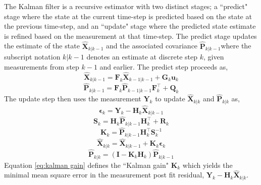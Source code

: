 \documentclass[fleqn,usenatbib,useAMS]{mnras}
\providecommand{\DIFaddbegin}{} %
\providecommand{\DIFaddend}{} %
\newcommand{\DIFaddincludegraphics}[2][]{{\color{blue}\fbox{\DIFOincludegraphics[#1]{#2}}}} %
\DeclareRobustCommand{\DIFaddbegin}{\DIFOaddbegin \let\includegraphics\DIFaddincludegraphics} %
\DeclareRobustCommand{\DIFaddend}{\DIFOaddend \let\includegraphics\DIFOincludegraphics} %
\begin{document}
The Kalman filter is a recursive estimator with two distinct stages; a ``predict" stage where the state at the current time-step is predicted based on the state at the previous time-step, and an ``update" stage where the predicted state estimate is refined based on the measurement at that time-step. The predict stage updates the estimate of the state $\hat{\boldsymbol{X}}_{k|k-1}$ and the associated covariance $\hat{\boldsymbol{P}}_{k|k-1}$where the subscript notation ${k|k-1}$ denotes an estimate at discrete step $k$, given measurements from step $k-1$ and earlier. The predict step proceeds as,
\begin{equation}
\hat{\boldsymbol{X}}_{k|k-1} =  \boldsymbol{F}_k \hat{\boldsymbol{X}}_{k-1|k-1} + \boldsymbol{G}_k \boldsymbol{u}_k
\end{equation}
\begin{equation}
	\hat{\boldsymbol{P}}_{k|k-1} =  \boldsymbol{F}_k \hat{\boldsymbol{P}}_{k-1|k-1} \boldsymbol{F}_k^\intercal + \boldsymbol{Q}_k 
\end{equation}
The update step then uses the measurement $\boldsymbol{Y}_k$ to update $\hat{\boldsymbol{X}}_{k|k}$  and $\hat{\boldsymbol{P}}_{k|k}$ as,
\begin{equation}
	\boldsymbol{\epsilon}_{k} = \boldsymbol{Y}_k - \boldsymbol{H}_k \hat{\boldsymbol{X}}_{k|k-1}
\end{equation} 
\begin{equation}
	\boldsymbol{S}_k = \boldsymbol{H}_k \hat{\boldsymbol{P}}_{k|k-1} \boldsymbol{H}_k^\intercal + \boldsymbol{R}_k
\end{equation}
\begin{equation}
	\boldsymbol{K}_k = \hat{\boldsymbol{P}}_{k|k-1} \boldsymbol{H}_k^\intercal \boldsymbol{S}_k^{-1} \label{eq:kalman gain}
\end{equation}
\begin{equation}
	\hat{\boldsymbol{X}}_{k|k} =\hat{\boldsymbol{X}}_{k|k-1} +\boldsymbol{K}_k  \boldsymbol{\epsilon}_{k}  \DIFaddbegin \label{eq:kalmangainupdate}
\DIFaddend \end{equation}
\begin{equation}
		\hat{\boldsymbol{P}}_{k|k} = \left( \boldsymbol{I} - \boldsymbol{K}_k \boldsymbol{H}_k \right) 	\hat{\boldsymbol{P}}_{k|k-1}
\end{equation}
Equation \eqref{eq:kalman gain} defines the ``Kalman gain" $\boldsymbol{K}_k$ which yields the minimal mean square error in the measurement post fit residual, $\boldsymbol{Y}_k - \boldsymbol{H}_k \hat{\boldsymbol{X}}_{k|k}$. \newline 
\end{document}
